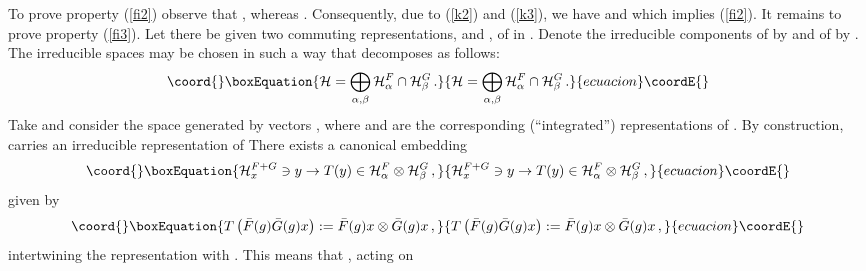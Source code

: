 \documentclass[a4paper,12pt]{article}
\begin{document}
To prove property (\ref{fi2}) observe that  \coordHE{},
whereas \coordHE{}. Consequently, due to (\ref{k2})
and (\ref{k3}), we have \coordHE{} and
\coordHE{} which implies (\ref{fi2}). It remains
to prove property (\ref{fi3}). Let there be given two commuting
representations, \coordHE{} and \coordHE{}, of \coordHE{} in \coordHE{}. Denote the
irreducible components of \coordHE{} by \coordHE{} and of \coordHE{} by \coordHE{}. The
irreducible spaces may be chosen in such a way that \coordHE{}
decomposes as follows:
\begin{equation}\coord{}\boxEquation{
{\cal H} = \bigoplus_{\alpha , \beta} {\cal H}^F_{\alpha} \cap
{\cal H}^G_{\beta} \, .
}{
{\cal H} = \bigoplus_{\alpha , \beta} {\cal H}^F_{\alpha} \cap
{\cal H}^G_{\beta} \, .
}{ecuacion}\coordE{}\end{equation}
Take \coordHE{}
and consider the space \coordHE{}
generated by vectors \coordHE{}, \coordHE{} where \coordHE{} and \coordHE{} are the corresponding
(``integrated'') representations of \coordHE{}. By construction,
\coordHE{} carries an irreducible representation of
\coordHE{} There exists a canonical embedding
\begin{equation}\coord{}\boxEquation{
{\cal H}^{F + G}_x \ni y \rightarrow T(y) \in {\cal H}^F_{\alpha}
\otimes {\cal H}^G_{\beta} \, ,
}{
{\cal H}^{F + G}_x \ni y \rightarrow T(y) \in {\cal H}^F_{\alpha}
\otimes {\cal H}^G_{\beta} \, ,
}{ecuacion}\coordE{}\end{equation}
given by
\begin{equation}\coord{}\boxEquation{
T \left( {\bar F}(g){\bar G}(g)x \right):= {\bar F}(g)x \otimes
{\bar G}(g) x\, ,
}{
T \left( {\bar F}(g){\bar G}(g)x \right):= {\bar F}(g)x \otimes
{\bar G}(g) x\, ,
}{ecuacion}\coordE{}\end{equation}
intertwining the representation \coordHE{} with \coordHE{}. This means that \coordHE{}, acting on
\end{document}
